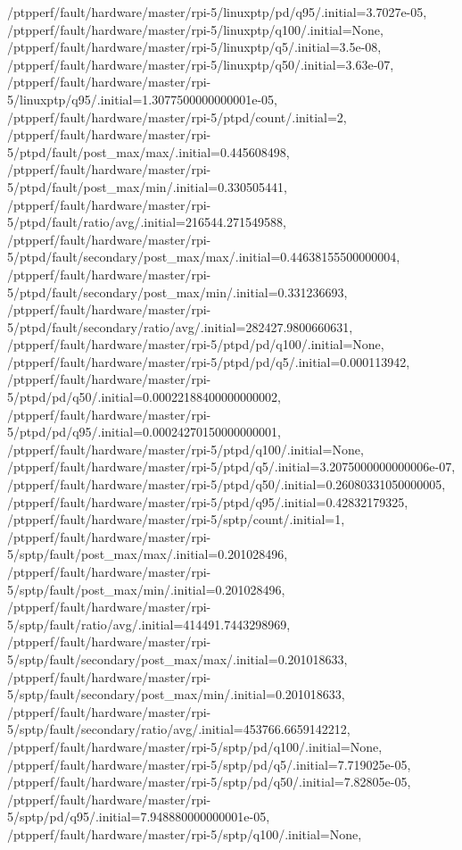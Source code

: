 {    /ptpperf/fault/hardware/master/rpi-5/linuxptp/pd/q95/.initial=3.7027e-05,
    /ptpperf/fault/hardware/master/rpi-5/linuxptp/q100/.initial=None,
    /ptpperf/fault/hardware/master/rpi-5/linuxptp/q5/.initial=3.5e-08,
    /ptpperf/fault/hardware/master/rpi-5/linuxptp/q50/.initial=3.63e-07,
    /ptpperf/fault/hardware/master/rpi-5/linuxptp/q95/.initial=1.3077500000000001e-05,
    /ptpperf/fault/hardware/master/rpi-5/ptpd/count/.initial=2,
    /ptpperf/fault/hardware/master/rpi-5/ptpd/fault/post_max/max/.initial=0.445608498,
    /ptpperf/fault/hardware/master/rpi-5/ptpd/fault/post_max/min/.initial=0.330505441,
    /ptpperf/fault/hardware/master/rpi-5/ptpd/fault/ratio/avg/.initial=216544.271549588,
    /ptpperf/fault/hardware/master/rpi-5/ptpd/fault/secondary/post_max/max/.initial=0.44638155500000004,
    /ptpperf/fault/hardware/master/rpi-5/ptpd/fault/secondary/post_max/min/.initial=0.331236693,
    /ptpperf/fault/hardware/master/rpi-5/ptpd/fault/secondary/ratio/avg/.initial=282427.9800660631,
    /ptpperf/fault/hardware/master/rpi-5/ptpd/pd/q100/.initial=None,
    /ptpperf/fault/hardware/master/rpi-5/ptpd/pd/q5/.initial=0.000113942,
    /ptpperf/fault/hardware/master/rpi-5/ptpd/pd/q50/.initial=0.00022188400000000002,
    /ptpperf/fault/hardware/master/rpi-5/ptpd/pd/q95/.initial=0.00024270150000000001,
    /ptpperf/fault/hardware/master/rpi-5/ptpd/q100/.initial=None,
    /ptpperf/fault/hardware/master/rpi-5/ptpd/q5/.initial=3.2075000000000006e-07,
    /ptpperf/fault/hardware/master/rpi-5/ptpd/q50/.initial=0.26080331050000005,
    /ptpperf/fault/hardware/master/rpi-5/ptpd/q95/.initial=0.42832179325,
    /ptpperf/fault/hardware/master/rpi-5/sptp/count/.initial=1,
    /ptpperf/fault/hardware/master/rpi-5/sptp/fault/post_max/max/.initial=0.201028496,
    /ptpperf/fault/hardware/master/rpi-5/sptp/fault/post_max/min/.initial=0.201028496,
    /ptpperf/fault/hardware/master/rpi-5/sptp/fault/ratio/avg/.initial=414491.7443298969,
    /ptpperf/fault/hardware/master/rpi-5/sptp/fault/secondary/post_max/max/.initial=0.201018633,
    /ptpperf/fault/hardware/master/rpi-5/sptp/fault/secondary/post_max/min/.initial=0.201018633,
    /ptpperf/fault/hardware/master/rpi-5/sptp/fault/secondary/ratio/avg/.initial=453766.6659142212,
    /ptpperf/fault/hardware/master/rpi-5/sptp/pd/q100/.initial=None,
    /ptpperf/fault/hardware/master/rpi-5/sptp/pd/q5/.initial=7.719025e-05,
    /ptpperf/fault/hardware/master/rpi-5/sptp/pd/q50/.initial=7.82805e-05,
    /ptpperf/fault/hardware/master/rpi-5/sptp/pd/q95/.initial=7.948880000000001e-05,
    /ptpperf/fault/hardware/master/rpi-5/sptp/q100/.initial=None,
}
